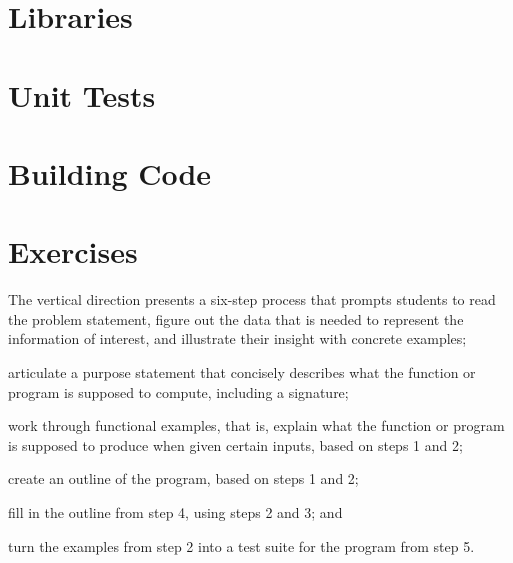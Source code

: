 \section{Libraries}

\section{Unit Tests}

\section{Building Code}

\section{Exercises}

The vertical direction presents a six-step process that prompts students to
read the problem statement, figure out the data that is needed to represent the information of interest, and illustrate their insight with concrete examples;

articulate a purpose statement that concisely describes what the function or program is supposed to compute, including a signature;

work through functional examples, that is, explain what the function or program is supposed to produce when given certain inputs, based on steps 1 and 2;

create an outline of the program, based on steps 1 and 2;

fill in the outline from step 4, using steps 2 and 3; and

turn the examples from step 2 into a test suite for the program from step 5.
